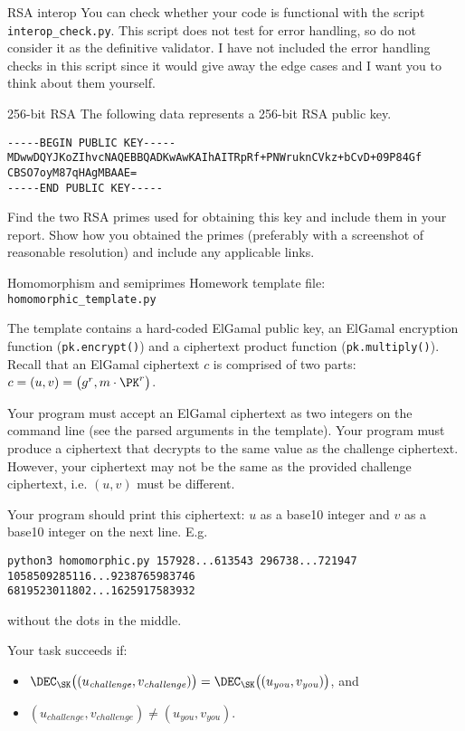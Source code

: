\documentclass{homework}
\begin{document}
\begin{task}{RSA interop}
  You can check whether your code is functional with the script \texttt{interop\_check.py}.
  This script does not test for error handling, so do not consider it as the definitive validator.
  I have not included the error handling checks in this script since it would give away the edge cases and I want you to think about them yourself.
\end{task}

\begin{task}{256-bit RSA}
  The following data represents a 256-bit RSA public key.
  \begin{Verbatim}
-----BEGIN PUBLIC KEY-----
MDwwDQYJKoZIhvcNAQEBBQADKwAwKAIhAITRpRf+PNWruknCVkz+bCvD+09P84Gf
CBSO7oyM87qHAgMBAAE=
-----END PUBLIC KEY-----
  \end{Verbatim}
  Find the two RSA primes used for obtaining this key and include them in your report.
  Show how you obtained the primes (preferably with a screenshot of reasonable resolution) and include any applicable links.
\end{task}

\begin{task}{Homomorphism and semiprimes}
  Homework template file: \texttt{homomorphic\_template.py}

  The template contains a hard-coded ElGamal public key, an ElGamal encryption function (\texttt{pk.encrypt()}) and a ciphertext product function (\texttt{pk.multiply()}).
  Recall that an ElGamal ciphertext $c$ is comprised of two parts: $c = (u, v) = \bigl(g^r, m\cdot\PK^r\bigr)$.

  Your program must accept an ElGamal ciphertext as two integers on the command line (see the parsed arguments in the template).
  Your program must produce a ciphertext that decrypts to the same value as the challenge ciphertext.
  However, your ciphertext may not be the same as the provided challenge ciphertext, i.e. $(u, v)$ must be different.

  Your program should print this ciphertext: $u$ as a base10 integer and $v$ as a base10 integer on the next line.
  E.g.
  \begin{Verbatim}
python3 homomorphic.py 157928...613543 296738...721947
1058509285116...9238765983746
6819523011802...1625917583932
  \end{Verbatim}
  without the dots in the middle.
  
  Your task succeeds if:
  \begin{itemize}
    \item $\DEC_\SK\bigl((u_\mathit{challenge}, v_\mathit{challenge})\bigr) = \DEC_\SK\bigl((u_\mathit{you}, v_\mathit{you})\bigr)$, and
    \item $(u_\mathit{challenge}, v_\mathit{challenge}) \neq (u_\mathit{you}, v_\mathit{you})$.
  \end{itemize}
\end{task}
\end{document}
